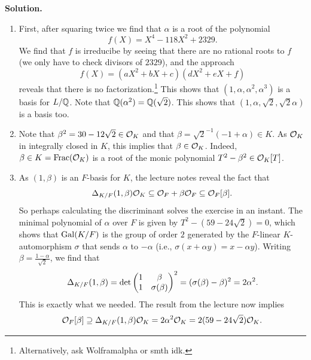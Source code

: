\documentclass[a4paper,11pt]{article}
\begin{document}
\textbf{Solution.}
\begin{enumerate}[wide, labelindent=0pt]
    \item First, after squaring twice we find that $\alpha$ is a root of the
        polynomial
        \begin{equation*}
            f(X) = X^4 - 118X^2 + 2329.
        \end{equation*}
        We find that $f$ is irreducibe by seeing that there are no rational roots to $f$
        (we only have to check divisors of $2329$), and the approach
        \begin{equation*}
            f(X) = (aX^2 + bX + c)(dX^2 + eX + f)
        \end{equation*}
        reveals that there is no factorization.\footnote{Alternatively, ask Wolframalpha
        or smth idk.} This shows that 
        $(1, \alpha, \alpha^2, \alpha^3)$ is a basis for $L/\mathbb{Q}$. Note that
        $\mathbb{Q}(\alpha^2) = \mathbb{Q}(\sqrt 2)$. This shows that $(1, \alpha, \sqrt 2, \sqrt 2 \alpha)$
        is a basis too.
    \item Note that $\beta^2 = 30 - 12\sqrt 2 \in \mathcal{O}_K$ and that $\beta = \sqrt 2^{-1}
        (-1 + \alpha) \in K$. As $\mathcal{O}_K$ in integrally closed in $K$, this implies that 
        $\beta \in \mathcal{O}_K$. Indeed, $\beta \in K = \mathrm{Frac} (\mathcal{O}_K)$ is a root of the monic
        polynomial $T^2 - \beta^2 \in \mathcal{O}_K[T]$.
    \item As $(1, \beta)$ is an $F$-basis for $K$, the lecture notes reveal the
        fact that $$\Delta_{K/F}(1, \beta) \mathcal{O}_K \subseteq \mathcal{O}_F + \beta \mathcal{O}_F
        \subseteq \mathcal{O}_F[\beta].$$ So perhaps calculating
        the discriminant solves the exercise in an instant. 
        The minimal polynomial of $\alpha$ over $F$ is given by $T^2 - (59 -
        24\sqrt 2) = 0$, which shows that $\operatorname{Gal}(K/F)$ is the group of order $2$
        generated by the $F$-linear $K$-automorphism $\sigma$ that sends $\alpha$ to 
        $-\alpha$ (i.e., $\sigma(x + \alpha y) = x - \alpha y$). Writing $\beta = \frac {1 - \alpha}{\sqrt 2}$, we find that 
        \begin{equation*}
            \Delta_{K/F}(1, \beta) = \det \begin{pmatrix} 1 & \beta\\ 1 & \sigma(\beta) \end{pmatrix}^2
            = (\sigma(\beta) - \beta)^2 = 2 \alpha^2.
        \end{equation*}
        This is exactly what we needed. The result from the lecture now implies
        \begin{equation*}
            \mathcal{O}_F[\beta] \supseteq \Delta_{K/F}(1, \beta) \mathcal{O}_K
            = 2 \alpha^2 \mathcal{O}_K = 2(59 - 24\sqrt 2) \mathcal{O}_K.
        \end{equation*}

        
\end{enumerate}


\contactend
\end{document}
